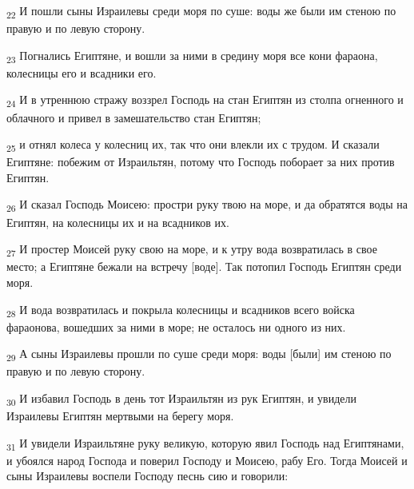 \begin{tcolorbox}
\textsubscript{22} И пошли сыны Израилевы среди моря по суше: воды же были им стеною по правую и по левую сторону.
\end{tcolorbox}
\begin{tcolorbox}
\textsubscript{23} Погнались Египтяне, и вошли за ними в средину моря все кони фараона, колесницы его и всадники его.
\end{tcolorbox}
\begin{tcolorbox}
\textsubscript{24} И в утреннюю стражу воззрел Господь на стан Египтян из столпа огненного и облачного и привел в замешательство стан Египтян;
\end{tcolorbox}
\begin{tcolorbox}
\textsubscript{25} и отнял колеса у колесниц их, так что они влекли их с трудом. И сказали Египтяне: побежим от Израильтян, потому что Господь поборает за них против Египтян.
\end{tcolorbox}
\begin{tcolorbox}
\textsubscript{26} И сказал Господь Моисею: простри руку твою на море, и да обратятся воды на Египтян, на колесницы их и на всадников их.
\end{tcolorbox}
\begin{tcolorbox}
\textsubscript{27} И простер Моисей руку свою на море, и к утру вода возвратилась в свое место; а Египтяне бежали на встречу [воде]. Так потопил Господь Египтян среди моря.
\end{tcolorbox}
\begin{tcolorbox}
\textsubscript{28} И вода возвратилась и покрыла колесницы и всадников всего войска фараонова, вошедших за ними в море; не осталось ни одного из них.
\end{tcolorbox}
\begin{tcolorbox}
\textsubscript{29} А сыны Израилевы прошли по суше среди моря: воды [были] им стеною по правую и по левую сторону.
\end{tcolorbox}
\begin{tcolorbox}
\textsubscript{30} И избавил Господь в день тот Израильтян из рук Египтян, и увидели Израилевы Египтян мертвыми на берегу моря.
\end{tcolorbox}
\begin{tcolorbox}
\textsubscript{31} И увидели Израильтяне руку великую, которую явил Господь над Египтянами, и убоялся народ Господа и поверил Господу и Моисею, рабу Его. Тогда Моисей и сыны Израилевы воспели Господу песнь сию и говорили:
\end{tcolorbox}
